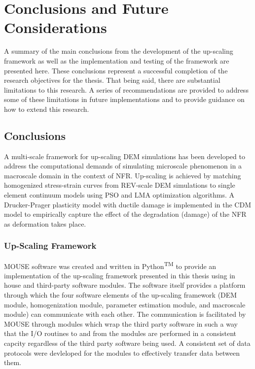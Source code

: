 \chapter{Conclusions and Future Considerations}

A summary of the main conclusions from the development of the up-scaling framework as well as the implementation and testing of the framework are presented here. These conclusions represent a successful completion of the research objectives for the thesis. That being said, there are substantial limitations to this research. A series of recommendations are provided to address some of these limitations in future implementations and to provide guidance on how to extend this research.

\section{Conclusions}
A multi-scale framework for up-scaling DEM simulations has been developed to address the computational demands of simulating microscale phenomenon in a macroscale domain in the context of NFR. Up-scaling is achieved by matching homogenized stress-strain curves from REV-scale DEM simulations to single element continuum models using PSO and LMA optimization algorithms. A Drucker-Prager plasticity model with ductile damage is implemented in the CDM model to empirically capture the effect of the degradation (damage) of the NFR as deformation takes place.

\subsection*{Up-Scaling Framework}

MOUSE software was created and written in Python\textsuperscript{TM} to provide an implementation of the up-scaling framework presented in this thesis using in house and third-party software modules. The software itself provides a platform through which the four software elements of the up-scaling framework (DEM module, homogenization module, parameter estimation module, and macroscale module) can communicate with each other. The communication is facilitated by MOUSE through modules which wrap the third party software in such a way that the I/O routines to and from the modules are performed in a consistent capcity regardless of the third party software being used. A consistent set of data protocols were devleloped for the modules to effectively transfer data between them.

